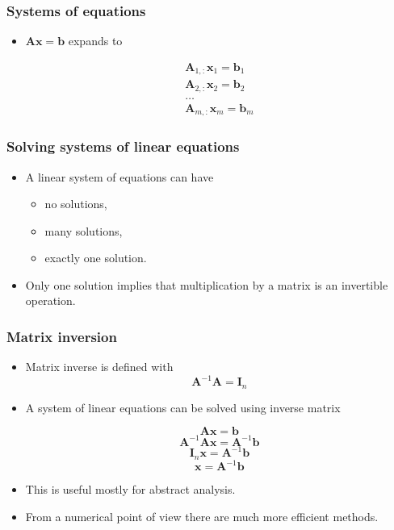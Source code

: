 \documentclass[notes]{beamer}          %
\newcommand{\vect}[1]{\bm{#1}}
\begin{document}
\begin{frame}
\frametitle{Systems of equations}
    \begin{itemize}
        \item $\vect{A}\vect{x} = \vect{b}$ expands to
        \begin{center}
        \begin{align}
            \vect{A}_{1,:} \vect{x}_1 = \vect{b}_1 \\
            \vect{A}_{2,:} \vect{x}_2 = \vect{b}_2 \\
            \ldots \\
            \vect{A}_{m,:} \vect{x}_m = \vect{b}_m
        \end{align}
        \end{center}
    \end{itemize}

\end{frame}




\begin{frame}
\frametitle{Solving systems of linear equations}
    \begin{itemize}
        \item A linear system of equations can have
            \begin{itemize}
                \item no solutions,
                \item many solutions,
                \item exactly one solution.
            \end{itemize}
        \item Only one solution implies that multiplication by a matrix is an invertible operation.
    \end{itemize}

\end{frame}

\begin{frame}
\frametitle{Matrix inversion}
    \begin{itemize}
        \item Matrix inverse is defined with
            $$ \vect{A}^{-1}\vect{A} = \vect{I}_n $$
        \item A system of linear equations can be solved using inverse matrix
        \begin{center}
            $$ \vect{A} \vect{x} = \vect{b} $$
            $$ \vect{A}^{-1}\vect{A} \vect{x} = \vect{A}^{-1}\vect{b} $$
            $$ \vect{I}_n \vect{x} = \vect{A}^{-1}\vect{b} $$
            $$ \vect{x} = \vect{A}^{-1}\vect{b} $$
        \end{center}
        \item This is useful mostly for abstract analysis.
        \item From a numerical point of view there are much more efficient methods.
    \end{itemize}
\end{frame}
\end{document}
